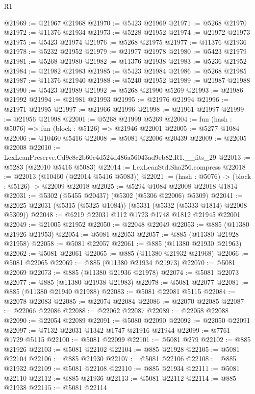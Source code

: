 \begin{lexlean}{R1}
\begin{coremodule}
@21969 := @21967 @21968
@21970 := @5423 @21969
@21971 := @5268 @21970
@21972 := @11376 @21934
@21973 := @5228 @21952
@21974 := @21972 @21973
@21975 := @5423 @21974
@21976 := @5268 @21975
@21977 := @11376 @21936
@21978 := @5232 @21952
@21979 := @21977 @21978
@21980 := @5423 @21979
@21981 := @5268 @21980
@21982 := @11376 @21938
@21983 := @5236 @21952
@21984 := @21982 @21983
@21985 := @5423 @21984
@21986 := @5268 @21985
@21987 := @11376 @21940
@21988 := @5240 @21952
@21989 := @21987 @21988
@21990 := @5423 @21989
@21992 := @5268 @21990 @5269
@21993 := @21986 @21992
@21994 := @21981 @21993
@21995 := @21976 @21994
@21996 := @21971 @21995
@21997 := @21966 @21996
@21998 := @21961 @21997
@21999 := @21956 @21998
@22001 := @5268 @21999 @5269
@22004 := fun (hash : @5076) => fun (block : @5126) => @21946 @22001
@22005 := @5277 @1084
@22006 := @10460 @5416
@22008 := @5081 @22006 @20439
@22009 := @22005 @22008
@22010 := LexLeanPreserve.Cd9c8c2b60c4d524d486a56043ad9eb82.R1.__fits_29
@22013 := @5283 (@22010 @5416 @5083)
@22014 := LexLeanStd.Sha256.compress
@22018 := @22013 (@10460 (@22014 @5416 @5083))
@22021 := (hash : @5076) -> (block : @5126) -> @22009 @22018
@22025 := @5294 @1084 @22008 @22018 @1814
@22031 := @5302 (@5455 @20437) (@5302 (@5306 @22006) @5309)
@22041 := @22025 @22031 (@5315 (@5325 @1084)) (@5331 (@5332 (@5333 @1814) @22008 @5309))
@22048 := @6219 @22031 @112 @1723 @1748 @1812 @21945 @22001
@22049 := @21005 @21952
@22050 := @22048 @22049
@22053 := @885 (@11380 @21926 @21953)
@22054 := @5081 @22053
@22057 := @885 (@11380 @21928 @21958)
@22058 := @5081 @22057
@22061 := @885 (@11380 @21930 @21963)
@22062 := @5081 @22061
@22065 := @885 (@11380 @21932 @21968)
@22066 := @5081 @22065
@22069 := @885 (@11380 @21934 @21973)
@22070 := @5081 @22069
@22073 := @885 (@11380 @21936 @21978)
@22074 := @5081 @22073
@22077 := @885 (@11380 @21938 @21983)
@22078 := @5081 @22077
@22081 := @885 (@11380 @21940 @21988)
@22083 := @5081 @22081 @5115
@22084 := @22078 @22083
@22085 := @22074 @22084
@22086 := @22070 @22085
@22087 := @22066 @22086
@22088 := @22062 @22087
@22089 := @22058 @22088
@22090 := @22054 @22089
@22091 := @5080 @22090
@22092 := @22050 @22091
@22097 := @7132 @22031 @1342 @1747 @21916 @21944
@22099 := @7761 @1729 @5115
@22100 := @5081 @22099
@22101 := @5081 @279
@22102 := @885 @21926
@22103 := @5081 @22102
@22104 := @885 @21928
@22105 := @5081 @22104
@22106 := @885 @21930
@22107 := @5081 @22106
@22108 := @885 @21932
@22109 := @5081 @22108
@22110 := @885 @21934
@22111 := @5081 @22110
@22112 := @885 @21936
@22113 := @5081 @22112
@22114 := @885 @21938
@22115 := @5081 @22114

\end{coremodule}
\end{lexlean}
